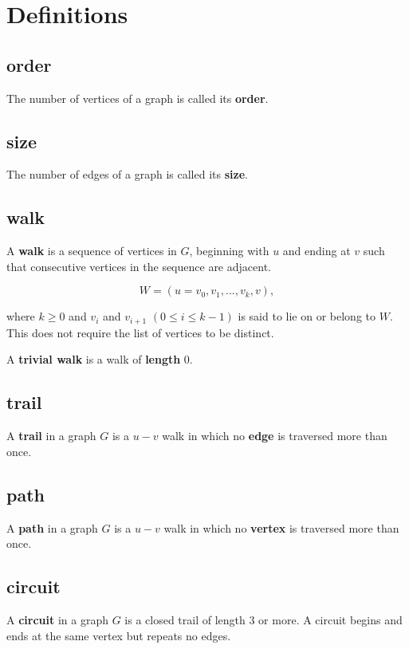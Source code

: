 \documentclass{article}
\begin{document}
\section*{Definitions}

\subsection*{order}

The number of vertices of a graph is called its \textbf{order}.

\subsection*{size}

The number of edges of a graph is called its \textbf{size}.

\subsection*{walk}

A \textbf{walk} is a sequence of vertices in $G$, beginning with $u$ and ending at $v$ such that consecutive vertices in the sequence are adjacent.

$$ W=(u =v_0, v_1, ..., v_k, v),$$

where $k \ge 0$ and $v_i$ and $v_{i+1}$ $(0 \le i \le k - 1)$ is said to lie on or belong to $W$.
This does not require the list of vertices to be distinct.

A \textbf{trivial walk} is a walk of \textbf{length} 0.

\subsection*{trail}

A \textbf{trail} in a graph $G$ is a $u-v$ walk in which no \textbf{edge} is traversed more than once.

\subsection*{path}

A \textbf{path} in a graph $G$ is a $u-v$ walk in which no \textbf{vertex} is traversed more than once.

\subsection*{circuit}

A \textbf{circuit} in a graph $G$ is a closed trail of length 3 or more.
A circuit begins and ends at the same vertex but repeats no edges.
\end{document}
